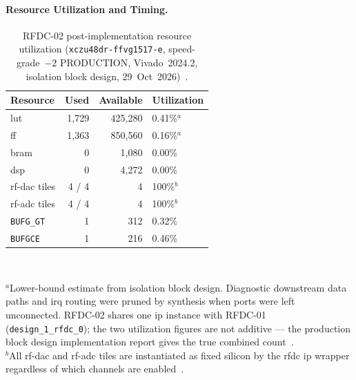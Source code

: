 \paragraph{Resource Utilization and Timing.}
\leavevmode\par
\begin{table}[!h]
  \caption{RFDC-02 post-implementation resource utilization
           (\texttt{xczu48dr\allowbreak-ffvg1517\allowbreak-e}, speed-grade~$-2$
           PRODUCTION, Vivado~2024.2, isolation block design,
           29~Oct~2026)~\cite{AMD_PG269}.}
  \label{tab:rfdc02_resources}
  \centering
  \begin{tabular}{lrrl}
    \hline
    Resource                & Used    & Available & Utilization \\
    \hline
    \ac{lut}                & 1{,}729 & 425{,}280 & 0.41\%$^{a}$ \\[2pt]
    \ac{ff}                 & 1{,}363 & 850{,}560 & 0.16\%$^{a}$ \\[2pt]
    \ac{bram}               &       0 & 1{,}080   & 0.00\%       \\[2pt]
    \ac{dsp}                &       0 & 4{,}272   & 0.00\%       \\[2pt]
    \ac{rf}-\ac{dac} tiles  &  4 / 4  & 4         & 100\%$^{b}$  \\[2pt]
    \ac{rf}-\ac{adc} tiles  &  4 / 4  & 4         & 100\%$^{b}$  \\[2pt]
    \texttt{BUFG\_GT}       &       1 & 312       & 0.32\%       \\[2pt]
    \texttt{BUFGCE}         &       1 & 216       & 0.46\%       \\
    \hline
  \end{tabular}\\[4pt]
  \begin{minipage}{\linewidth}
    \small
    $^{a}$Lower-bound estimate from isolation block design.
    Diagnostic downstream data paths and \ac{irq} routing were
    pruned by synthesis when ports were left unconnected.
    RFDC-02 shares one \ac{ip} instance with RFDC-01
    (\texttt{design\_1\_rfdc\_0}); the two utilization figures
    are not additive --- the production block design implementation
    report gives the true combined count~\cite{AMD_PG269}.\\[3pt]
    $^{b}$All \ac{rf}-\ac{dac} and \ac{rf}-\ac{adc} tiles are
    instantiated as fixed silicon by the \ac{rfdc} \ac{ip}
    wrapper regardless of which channels are
    enabled~\cite{AMD_PG269}.
  \end{minipage}
\end{table}

